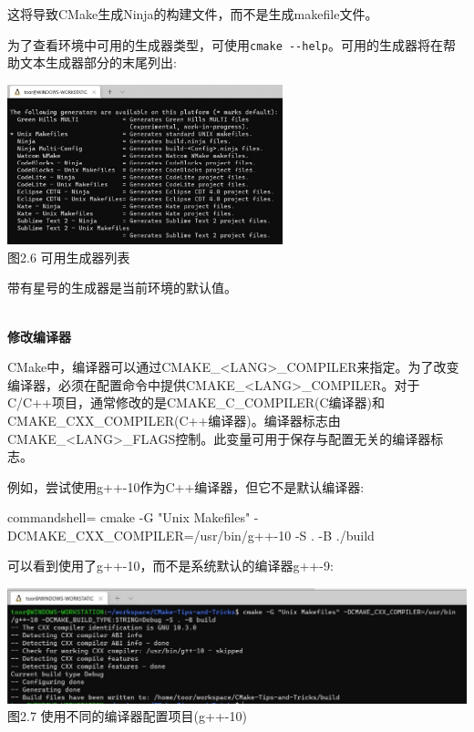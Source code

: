 这将导致CMake生成Ninja的构建文件，而不是生成makefile文件。

为了查看环境中可用的生成器类型，可使用\texttt{cmake -{}-help}。可用的生成器将在帮助文本生成器部分的末尾列出:

\begin{center}
\includegraphics[width=0.6\textwidth]{content/1/chapter2/images/6.jpg}\\
图2.6 可用生成器列表
\end{center}

带有星号的生成器是当前环境的默认值。

\hspace*{\fill} \\ %
\noindent
\textbf{修改编译器}

CMake中，编译器可以通过CMAKE\_<LANG>\_COMPILER来指定。为了改变编译器，必须在配置命令中提供CMAKE\_<LANG>\_COMPILER。对于C/C++项目，通常修改的是CMAKE\_C\_COMPILER(C编译器)和CMAKE\_CXX\_COMPILER(C++编译器)。编译器标志由CMAKE\_<LANG>\_FLAGS控制。此变量可用于保存与配置无关的编译器标志。

例如，尝试使用g++-10作为C++编译器，但它不是默认编译器:

\begin{tcblisting}{commandshell={}}
cmake -G "Unix Makefiles" -DCMAKE_CXX_COMPILER=/usr/bin/g++-10 -S .  
  -B ./build
\end{tcblisting}

可以看到使用了g++-10，而不是系统默认的编译器g++-9:

\begin{center}
\includegraphics[width=1.\textwidth]{content/1/chapter2/images/7.jpg}\\
图2.7 使用不同的编译器配置项目(g++-10)
\end{center}

